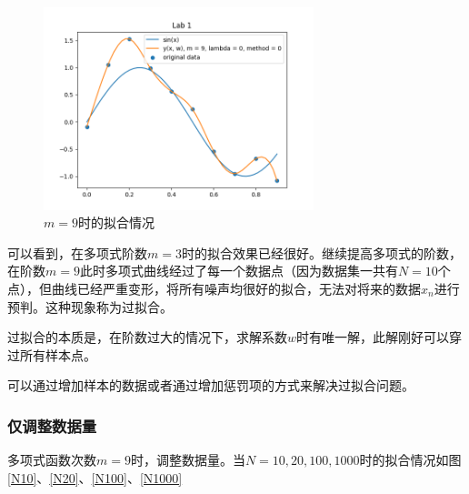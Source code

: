 \begin{figure}
    \centering
    \includegraphics[width=0.7\textwidth]{figures/Figure_4.png}
    \caption{$m = 9$时的拟合情况}
    \label{m9}
\end{figure}

可以看到，在多项式阶数$m = 3$时的拟合效果已经很好。继续提高多项式的阶数，在阶数$m = 9$此时多项式曲线经过了每一个数据点（因为数据集一共有$N = 10$个点），但曲线已经严重变形，将所有噪声均很好的拟合，无法对将来的数据$x_n$进行预判。这种现象称为过拟合。

过拟合的本质是，在阶数过大的情况下，求解系数$w$时有唯一解，此解刚好可以穿过所有样本点。

可以通过增加样本的数据或者通过增加惩罚项的方式来解决过拟合问题。

\subsubsection{仅调整数据量}

多项式函数次数$m = 9$时，调整数据量。当$N = 10, 20, 100, 1000$时的拟合情况如图\ref{N10}、\ref{N20}、\ref{N100}、\ref{N1000}

